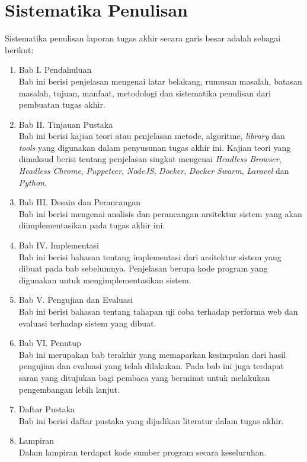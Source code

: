 	\section{Sistematika Penulisan}
		Sistematika penulisan laporan tugas akhir secara garis besar adalah sebagai berikut:
		\begin{enumerate}
			\item Bab I. Pendahuluan\\
				Bab ini berisi penjelasan mengenai latar belakang, rumusan masalah, batasan masalah, tujuan, manfaat, metodologi dan sistematika penulisan dari pembuatan tugas akhir.
			\item Bab II. Tinjauan Pustaka\\
				Bab ini berisi kajian teori atau penjelasan metode, algoritme, \textit{library} dan \textit{tools} yang digunakan dalam penyusunan tugas akhir ini. Kajian teori yang dimaksud berisi tentang penjelasan singkat mengenai \textit{Headless Browser}, \textit{Headless Chrome}, \textit{Puppeteer}, \textit{NodeJS}, \textit{Docker}, \textit{Docker Swarm}, \textit{Laravel} dan \textit{Python}.
			\item Bab III. Desain dan Perancangan\\
				Bab ini berisi mengenai analisis dan perancangan arsitektur sistem yang akan diimplementasikan pada tugas akhir ini.
			\item Bab IV. Implementasi\\
				Bab ini berisi bahasan tentang implementasi dari arsitektur sistem yang dibuat pada bab sebelumnya. Penjelasan berupa kode program yang digunakan untuk mengimplementasikan sistem.
			\item Bab V. Pengujian dan Evaluasi\\
				Bab ini berisi bahasan tentang tahapan uji coba terhadap performa web dan evaluasi terhadap sistem yang dibuat.
			\item Bab VI. Penutup\\
				Bab ini merupakan bab terakhir yang memaparkan kesimpulan dari hasil pengujian dan evaluasi yang telah dilakukan. Pada bab ini juga terdapat saran yang ditujukan bagi pembaca yang berminat untuk melakukan pengembangan lebih lanjut.
			\item Daftar Pustaka\\
				Bab ini berisi daftar pustaka yang dijadikan literatur dalam tugas akhir.
			\item Lampiran\\
				Dalam lampiran terdapat kode sumber program secara keseluruhan.
		\end{enumerate}